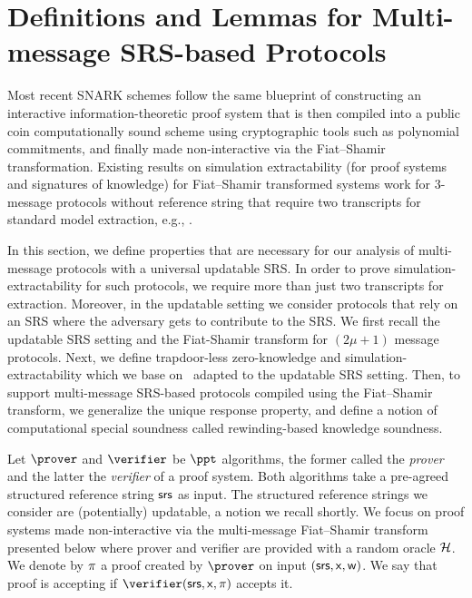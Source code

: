 \section{Definitions and Lemmas for Multi-message SRS-based Protocols}
\label{sec:se_definitions}
\label{sec:preliminaries}



Most recent SNARK schemes follow the same blueprint of constructing an interactive information-theoretic proof system 
that is then compiled into a public coin computationally sound scheme using cryptographic tools such as polynomial commitments,
and finally made non-interactive via the Fiat--Shamir transformation.
Existing results on simulation extractability (for proof systems and
signatures of knowledge) for Fiat--Shamir transformed systems work for $3$-message protocols without reference string that
require two transcripts for standard model extraction, e.g.,
\cite{JC:PoiSte00,INDOCRYPT:FKMV12,C:RotSeg21}.

In this section, we define properties that are necessary for our
analysis of multi-message protocols with a universal updatable SRS.  In order to
prove simulation-extractability for such protocols, we require more than just two
transcripts for extraction. Moreover, in the updatable setting we consider protocols
that rely on an SRS where the adversary gets to contribute to the SRS. We first recall the updatable SRS setting and the Fiat-Shamir transform for $(2\mu+1)$ message protocols.
Next, we define trapdoor-less zero-knowledge and simulation-extractability
which we base on~\cite{INDOCRYPT:FKMV12} adapted to the updatable SRS setting. Then,
to support multi-message SRS-based protocols compiled using the Fiat--Shamir transform,
we generalize the unique response property, and define a notion of computational special
soundness called rewinding-based knowledge soundness.\medskip


\noindent Let $\prover$ and $\verifier$ be $\ppt$ algorithms, the former called the \emph{prover}
and the latter the \emph{verifier} of a proof system. Both algorithms take a pre-agreed structured reference string $\mathsf{srs}$ as input. The structured reference strings we consider are (potentially) updatable, a notion we recall shortly.
%
We focus on proof systems made non-interactive via the multi-message Fiat--Shamir transform presented below where prover and
verifier are provided with a random oracle $\mathcal{H}$. 
We denote by $\pi$ a proof created by $\prover$ on input
$(\mathsf{srs}, \mathsf{x}, \mathsf{w})$. We say that proof is accepting if $\verifier(\srs, \inp,
\zkproof)$ accepts it.

